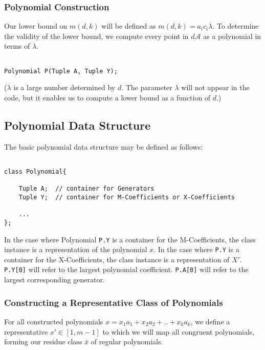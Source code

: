 \subsubsection{Polynomial Construction}

Our lower bound on $m(d, k)$ will be defined as $m(d, k) = a_{i}c_{i} \lambda$. To determine the validity of the lower bound, we compute every point in $d \mathcal{A}$ as a polynomial in terms of $\lambda$.\n

\begin{lstlisting}

Polynomial P(Tuple A, Tuple Y);

\end{lstlisting}

\noindent
($\lambda$ is a large number determined by $d$. The parameter $\lambda$ will not appear in the code, but it enables us to compute a lower bound as a function of $d$.)\n

\subsection*{Polynomial Data Structure} The basic polynomial data structure may be defined as follows:

\begin{lstlisting}

class Polynomial{

    Tuple A;  // container for Generators
    Tuple Y;  // container for M-Coefficients or X-Coefficients

    ...
};

\end{lstlisting}

In the case where Polynomial \lstinline{P.Y} is a container for the M-Coefficients, the class instance is a representation of the polynomial $x$. In the case where \lstinline{P.Y} is a container for the X-Coefficients, the class instance is a representation of $X'$.
\lstinline{P.Y[0]} will refer to the largest polynomial coefficient. \lstinline{P.A[0]} will refer to the largest corresponding generator.

\subsubsection{Constructing a Representative Class of Polynomials}

For all constructed polynomials $x = x_1a_{1} + x_2a_{2} + .. + x_{k}a_{k}$, we define a representative $x' \in [1, m-1]$ to which we will map all congruent polynomials, forming our residue class $\bar{x}$ of regular polynomials.\n

